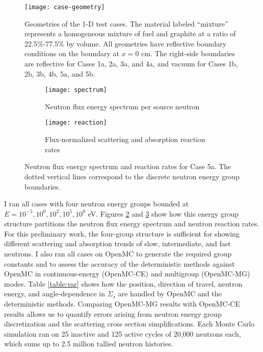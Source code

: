 \begin{figure}[htb!]
  \centering
  \texttt{[image: case-geometry]}
  \caption{Geometries of the 1-D test cases. The material labeled ``mixture'' represents a
    homogeneous mixture of fuel and graphite at a ratio of 22.5\%-77.5\% by volume. All geometries
    have reflective boundary conditions on the boundary at $x=0$ cm. The right-side boundaries are
    reflective for Cases 1a, 2a, 3a, and 4a, and vacuum for Cases 1b, 2b, 3b, 4b, 5a, and 5b.}
  \label{fig:case-geom}
\end{figure}
%
\begin{figure}[htb!]
  \centering
  \begin{subfigure}[t]{.49\textwidth}
    \centering
    \texttt{[image: spectrum]}
    \caption{Neutron flux energy spectrum per source neutron}
    \label{fig:spectrum}
  \end{subfigure}
  \hfill
  \begin{subfigure}[t]{.49\textwidth}
    \centering
    \texttt{[image: reaction]}
    \caption{Flux-normalized scattering and absorption reaction rates}
    \label{fig:reaction}
  \end{subfigure}
  \caption{Neutron flux energy spectrum and reaction rates for Case 5a. The dotted vertical lines
  correspond to the discrete neutron energy group boundaries.}
  \label{fig:spec-reac}
\end{figure}
%

I ran all cases with four neutron energy groups bounded at $E=10^{-5}, 10^0, 10^2, 10^5, 10^8$
eV. Figures \ref{fig:spectrum} and \ref{fig:reaction} show how this energy group structure
partitions the neutron flux energy spectrum and neutron reaction rates. For this preliminary work,
the four-group structure is sufficient for showing different scattering and absorption trends of
slow, intermediate, and fast neutrons. I also ran all cases on OpenMC to generate the required
group constants and to assess the accuracy of the deterministic methods against OpenMC in
continuous-energy (OpenMC-CE) and multigroup (OpenMC-MG) modes. Table \ref{table:var} shows how the
position, direction of travel, neutron energy, and angle-dependence in $\Sigma_s$ are handled by
OpenMC and the deterministic methods. Comparing OpenMC-MG results with OpenMC-CE results allows us
to quantify errors arising from neutron energy group discretization and the scattering cross
section simplifications. Each Monte Carlo simulation ran on 25 inactive and 125 active cycles of
20,000 neutrons each, which sums up to 2.5 million tallied neutron histories.


